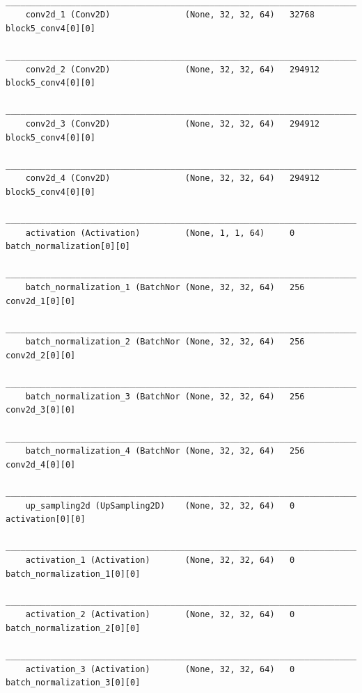 {\begin{verbatim}
    __________________________________________________________________________________________________
    conv2d_1 (Conv2D)               (None, 32, 32, 64)   32768       block5_conv4[0][0]               
    __________________________________________________________________________________________________
    conv2d_2 (Conv2D)               (None, 32, 32, 64)   294912      block5_conv4[0][0]               
    __________________________________________________________________________________________________
    conv2d_3 (Conv2D)               (None, 32, 32, 64)   294912      block5_conv4[0][0]               
    __________________________________________________________________________________________________
    conv2d_4 (Conv2D)               (None, 32, 32, 64)   294912      block5_conv4[0][0]               
    __________________________________________________________________________________________________
    activation (Activation)         (None, 1, 1, 64)     0           batch_normalization[0][0]        
    __________________________________________________________________________________________________
    batch_normalization_1 (BatchNor (None, 32, 32, 64)   256         conv2d_1[0][0]                   
    __________________________________________________________________________________________________
    batch_normalization_2 (BatchNor (None, 32, 32, 64)   256         conv2d_2[0][0]                   
    __________________________________________________________________________________________________
    batch_normalization_3 (BatchNor (None, 32, 32, 64)   256         conv2d_3[0][0]                   
    __________________________________________________________________________________________________
    batch_normalization_4 (BatchNor (None, 32, 32, 64)   256         conv2d_4[0][0]                   
    __________________________________________________________________________________________________
    up_sampling2d (UpSampling2D)    (None, 32, 32, 64)   0           activation[0][0]                 
    __________________________________________________________________________________________________
    activation_1 (Activation)       (None, 32, 32, 64)   0           batch_normalization_1[0][0]      
    __________________________________________________________________________________________________
    activation_2 (Activation)       (None, 32, 32, 64)   0           batch_normalization_2[0][0]      
    __________________________________________________________________________________________________
    activation_3 (Activation)       (None, 32, 32, 64)   0           batch_normalization_3[0][0]      

\end{verbatim}}
